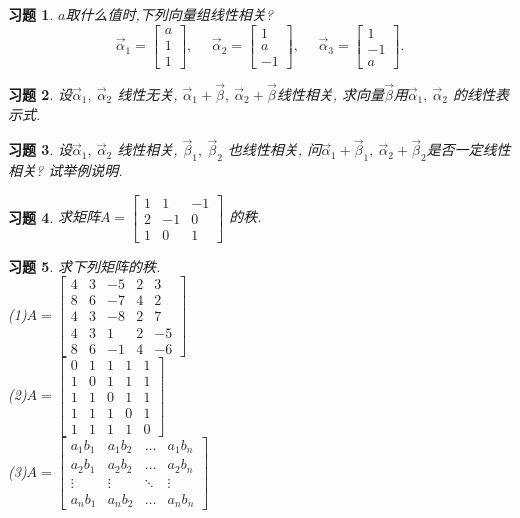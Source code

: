\documentclass[a4paper]{book}
\newtheorem{ex}{习题}[chapter]
\begin{document}
\begin{ex}\label{4.16}
$a$取什么值时,下列向量组线性相关?
\begin{displaymath}\vec{\alpha}_1=\begin{bmatrix}a\\1\\1\end{bmatrix},\ \ \ \  \ \  \vec{\alpha}_2=\begin{bmatrix}1\\a\\-1\end{bmatrix},\ \ \ \     \ \ \vec{\alpha}_3=\begin{bmatrix}1\\-1\\a\end{bmatrix}.
\end{displaymath}
\end{ex}

\begin{ex}\label{4.17}
设$\vec{\alpha}_1,\ \vec{\alpha}_2$ 线性无关, $\vec{\alpha}_1+\vec{\beta}, \ \vec{\alpha}_2+\vec{\beta}$线性相关,
求向量$\vec{\beta}$用$\vec{\alpha}_1,\ \vec{\alpha}_2$ 的线性表示式.
\end{ex}

\begin{ex}\label{4.18}
设$\vec{\alpha}_1,\ \vec{\alpha}_2$ 线性相关, $\vec{\beta}_1,\ \vec{\beta}_2$ 也线性相关,
问$\vec{\alpha}_1+\vec{\beta}_1,\ \vec{\alpha}_2+\vec{\beta}_2$是否一定线性相关? 试举例说明.
\end{ex}

\begin{ex}\label{4.19}
求矩阵$A=\begin{bmatrix}1&1&-1\\2&-1&0\\1&0&1\end{bmatrix}$ 的秩.
\end{ex}

\begin{ex}\label{4.20}
求下列矩阵的秩.\\
(1)$A=\left[\begin{array}{ccccc}4&3&-5&2&3\\8&6&-7&4&2\\4&3&-8&2&7\\4&3&1&2&-5\\8&6&-1&4&-6\end{array}\right] $\\
(2)$A=\left[\begin{array}{ccccc}0&1&1&1&1\\1&0&1&1&1\\1&1&0&1&1\\ 1&1&1&0&1\\1&1&1&1&0\end{array}\right]$\\
(3)$A=\begin{bmatrix}a_1b_1 & a_1b_2& \dots & a_1b_n\\a_2b_1 &a_2b_2& \dots & a_2b_n\\ \vdots & \vdots &\ddots  &\vdots \\ a_nb_1 &a_nb_2 &\dots& a_nb_n\end{bmatrix}$
\end{ex}
\end{document}
